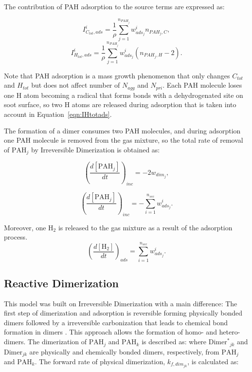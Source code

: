The contribution of PAH adsorption to the source terms are expressed as:

\begin{equation}
	I^i_{C_{tot},ads} = \frac{1}{\rho}\sum_{j=1}^{n_{PAH_j}} w^i_{ads_j} n_{PAH_j,C},
	\label{eqn:ICtotads}
\end{equation}
\begin{equation}
	I^i_{H_{tot},ads} =\frac{1}{\rho} \sum_{j=1}^{n_{PAH_j}} w^i_{ads_j} (n_{PAH_j,H}-2).
	\label{eqn:IHtotads}
\end{equation}

Note that PAH adsorption is a mass growth phenomenon that only changes $C_{tot}$ and $H_{tot}$ but does not affect number of $N_{agg}$ and $N_{pri}$. Each PAH molecule loses one H atom becoming a radical that forms bonds with a dehydrogenated site on soot surface, so two H atoms are released during adsorption that is taken into account in Equation~\eqref{eqn:IHtotads}.

The formation of a dimer consumes two PAH molecules, and during adsorption one PAH molecule is removed from the gas mixture, so the total rate of removal of $\mathrm{PAH}_j$ by Irreversible Dimerization is obtained as:

\begin{equation}
	\left(
	\frac{d\left[{\mathrm{PAH}_j}\right]}{dt}
	\right)_{inc}
	= 
	-2w_{dim_j},
	\label{eqn:PAHscrub_irrevdim_inc}
\end{equation}

\begin{equation}
	\left(
	\frac{d\left[{\mathrm{PAH}_j}\right]}{dt}
	\right)_{inc}
	= 
	-\sum_{i=1}^{n_{sec}}w^i_{ads_j}.
	\label{eqn:PAHscrub_irrevdim_ads}
\end{equation}

Moreover, one $\mathrm{H_2}$ is released to the gas mixture as a result of the adsorption process.
\begin{equation}
	\left(
	\frac{d\left[{\mathrm{H_2}}\right]}{dt}
	\right)_{ads}
	= 
	\sum_{i=1}^{n_{sec}}w^i_{ads_j}
	\label{eqn:H2scrub_irrevdim}.
\end{equation}


\subsection{Reactive Dimerization}
\label{sec:reacvdim}

This model was built on Irreversible Dimerization with a main difference: The first step of dimerization and adsorption is reversible forming physically bonded dimers followed by a irreversible carbonization that leads to chemical bond formation in dimers \citep{kholghy2018reactive}. This approach allows the formation of homo- and hetero-dimers. The dimerization of $\mathrm{PAH}_j$ and $\mathrm{PAH}_k$ is described as:
\noindent where $\mathrm{Dimer^*}_{jk}$ and $\mathrm{Dimer}_{jk}$ are physically and chemically bonded dimers, respectively, from $\mathrm{PAH}_j$ and $\mathrm{PAH}_k$. The forward rate of physical dimerization, ${k_{f,dim_{jk}}}$, is calculated as:

